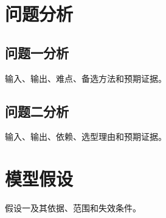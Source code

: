 \begin{abstract}
本文研究两问建模任务，并建立统一约束框架。

针对问题一，采用基线模型得到结果一，并通过边界检验验证。

针对问题二，采用扩展模型得到结果二，并通过敏感性分析验证。
\end{abstract}

\section{问题分析}
\subsection{问题一分析}
输入、输出、难点、备选方法和预期证据。
\subsection{问题二分析}
输入、输出、依赖、选型理由和预期证据。

\section{模型假设}
假设一及其依据、范围和失效条件。

